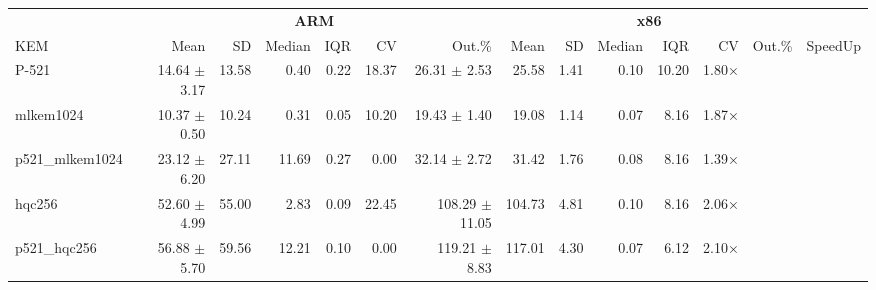 \begin{table}[!ht]
\centering
\begin{tabular}{l|rrrrrr|rrrrrr|r}
\toprule
& \multicolumn{6}{c}{\bfseries ARM} & \multicolumn{6}{c}{\bfseries x86} & \\
\cmidrule(lr){2-7} \cmidrule(lr){8-13}
KEM & Mean & SD & Median & IQR & CV & Out.\% & Mean & SD & Median & IQR & CV & Out.\% & SpeedUp \\
\midrule
P-521 			& 14.64 $\pm$ 3.17 & 13.58 & 0.40 & 0.22 & 18.37 & 26.31  $\pm$ 2.53 & 25.58 & 1.41 & 0.10 & 10.20 & 1.80× \\
mlkem1024 		& 10.37 $\pm$ 0.50 & 10.24 & 0.31 & 0.05 & 10.20 & 19.43  $\pm$ 1.40 & 19.08 & 1.14 & 0.07 & 8.16 & 1.87× \\
p521\_mlkem1024 & 23.12 $\pm$ 6.20 & 27.11 & 11.69 & 0.27 & 0.00 & 32.14  $\pm$ 2.72 & 31.42 & 1.76 & 0.08 & 8.16 & 1.39× \\
hqc256 			& 52.60 $\pm$ 4.99 & 55.00 & 2.83 & 0.09 & 22.45 & 108.29 $\pm$ 11.05 & 104.73 & 4.81 & 0.10 & 8.16 & 2.06× \\
p521\_hqc256 	& 56.88 $\pm$ 5.70 & 59.56 & 12.21 & 0.10 & 0.00 & 119.21 $\pm$ 8.83 & 117.01 & 4.30 & 0.07 & 6.12 & 2.10× \\
\bottomrule
\end{tabular}
\end{table}
